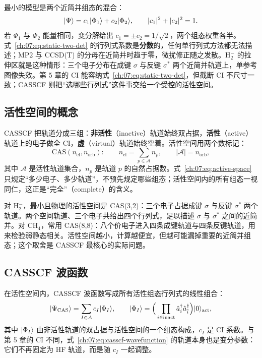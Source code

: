 最小的模型是两个近简并组态的混合：
\begin{equation}
\lvert \Psi\rangle=c_1\lvert \Phi_1\rangle+c_2\lvert \Phi_2\rangle,
\qquad
|c_1|^2+|c_2|^2=1 .
\label{ch:07:eq:static-two-det}
\end{equation}
若 $\Phi_1$ 与 $\Phi_2$ 能量相同，变分解给出 $c_1=\pm c_2=1/\sqrt{2}$，两个组态权重各半。式~\eqref{ch:07:eq:static-two-det} 的行列式系数是\textbf{分数}的，任何单行列式方法都无法描述；MP2 与 CCSD(T) 的分母在近简并时趋于零，微扰修正随之发散。H$_2^-$ 的拉伸区就是这种情形：三个电子分布在成键 $\sigma$ 与反键 $\sigma^*$ 两个近简并轨道上，单参考图像失效。第 5 章的 CI 能容纳式~\eqref{ch:07:eq:static-two-det}，但截断 CI 不尺寸一致；CASSCF 则把“选哪些行列式”这件事交给一个受控的活性空间。

\subsection{活性空间的概念}
\label{ch:07:sec:active-space}

CASSCF 把轨道分成三组：\textbf{非活性}（inactive）轨道始终双占据，\textbf{活性}（active）轨道上的电子做全 CI，\textbf{虚}（virtual）轨道始终空着。活性空间用两个数标记：
\begin{equation}
\mathrm{CAS}(n_{\mathrm{el}},n_{\mathrm{orb}}):
\qquad
n_{\mathrm{el}}=\sum_{p\in\mathcal{A}} n_p,
\qquad
|\mathcal{A}|=n_{\mathrm{orb}},
\label{ch:07:eq:active-space}
\end{equation}
其中 $\mathcal{A}$ 是活性轨道集合，$n_p$ 是轨道 $p$ 的自然占据数。式~\eqref{ch:07:eq:active-space} 只规定“多少电子、多少轨道”，不预先规定哪些组态；活性空间内的所有组态一视同仁，这正是“完全”（complete）的含义。

对 H$_2^-$，最小且物理的活性空间是 CAS(3,2)：三个电子占据成键 $\sigma$ 与反键 $\sigma^*$ 两个轨道。两个空间轨道、三个电子共给出四个行列式，足以描述 $\sigma$ 与 $\sigma^*$ 之间的近简并。对 CH$_4$，常用 CAS(8,8)：八个价电子进入四条成键轨道与四条反键轨道，用来检验弱静态相关。活性空间越小，计算越便宜，但越可能漏掉重要的近简并组态；这个取舍是 CASSCF 最核心的实际问题。

\subsection{CASSCF 波函数}
\label{ch:07:sec:wavefunction}

在活性空间内，CASSCF 波函数写成所有活性组态行列式的线性组合：
\begin{equation}
\lvert \Psi_{\mathrm{CAS}}\rangle
=\sum_{I\in\mathcal{A}} c_I\lvert \Phi_I\rangle,
\qquad
\lvert \Phi_I\rangle
=\Big(\prod_{i\in\mathrm{inact}}\hat{a}_i^\dagger\hat{a}_{\bar i}^\dagger\Big)
\lvert 0\rangle_{\mathrm{act}},
\label{ch:07:eq:casscf-wavefunction}
\end{equation}
其中 $\lvert \Phi_I\rangle$ 由非活性轨道的双占据与活性空间的一个组态构成，$c_I$ 是 CI 系数。与第 5 章的 CI 不同，式~\eqref{ch:07:eq:casscf-wavefunction} 的轨道本身也是变分参数：它们不再固定为 HF 轨道，而是随 $c_I$ 一起调整。


